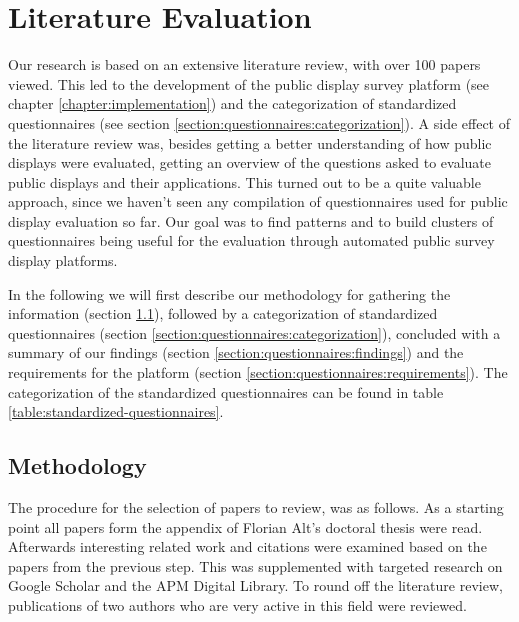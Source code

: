 \section{Literature Evaluation}
\label{chapter:literature-evaluation}

	Our research is based on an extensive literature review, with over 100 papers viewed. This led to the development of the public display survey platform (see chapter \ref{chapter:implementation}) and the categorization of standardized questionnaires (see section \ref{section:questionnaires:categorization}). A side effect of the literature review was, besides getting a better understanding of how public displays were evaluated, getting an overview of the questions asked to evaluate public displays and their applications. This turned out to be a quite valuable approach, since we haven't seen any compilation of questionnaires used for public display evaluation so far. Our goal was to find patterns and to build clusters of questionnaires being useful for the evaluation through automated public survey display platforms.

	In the following we will first describe our methodology for gathering the information (section \ref{section:questionnaires:methodology}), followed by a categorization of standardized questionnaires (section \ref{section:questionnaires:categorization}), concluded with a summary of our findings (section \ref{section:questionnaires:findings}) and the requirements for the platform (section \ref{section:questionnaires:requirements}). The categorization of the standardized questionnaires can be found in table \ref{table:standardized-questionnaires}.



\subsection{Methodology}
\label{section:questionnaires:methodology}

	The procedure for the selection of papers to review, was as follows. As a starting point all papers form the appendix of Florian Alt's doctoral thesis \cite{alt2013thesis} were read. Afterwards interesting related work and citations were examined based on the papers from the previous step. This was supplemented with targeted research on Google Scholar and the APM Digital Library. To round off the literature review, publications of two authors who are very active in this field were reviewed. 

